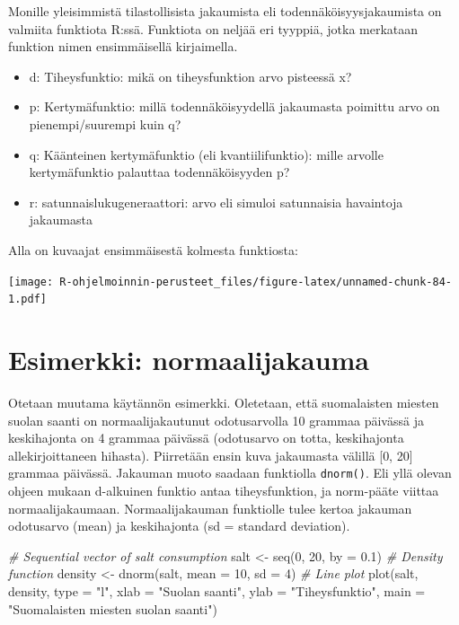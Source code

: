 \documentclass[
]{book}
\newenvironment{Shaded}{\begin{snugshade}}{\end{snugshade}}
\newcommand{\AttributeTok}[1]{\textcolor[rgb]{0.77,0.63,0.00}{#1}}
\newcommand{\CommentTok}[1]{\textcolor[rgb]{0.56,0.35,0.01}{\textit{#1}}}
\newcommand{\DecValTok}[1]{\textcolor[rgb]{0.00,0.00,0.81}{#1}}
\newcommand{\FloatTok}[1]{\textcolor[rgb]{0.00,0.00,0.81}{#1}}
\newcommand{\FunctionTok}[1]{\textcolor[rgb]{0.00,0.00,0.00}{#1}}
\newcommand{\NormalTok}[1]{#1}
\newcommand{\OtherTok}[1]{\textcolor[rgb]{0.56,0.35,0.01}{#1}}
\newcommand{\StringTok}[1]{\textcolor[rgb]{0.31,0.60,0.02}{#1}}
\providecommand{\tightlist}{%
  \setlength{\itemsep}{0pt}\setlength{\parskip}{0pt}}
\begin{document}
Monille yleisimmistä tilastollisista jakaumista eli todennäköisyysjakaumista on valmiita funktiota R:ssä. Funktiota on neljää eri tyyppiä, jotka merkataan funktion nimen ensimmäisellä kirjaimella.

\begin{itemize}
\tightlist
\item
  d: Tiheysfunktio: mikä on tiheysfunktion arvo pisteessä x?
\item
  p: Kertymäfunktio: millä todennäköisyydellä jakaumasta poimittu arvo on pienempi/suurempi kuin q?
\item
  q: Käänteinen kertymäfunktio (eli kvantiilifunktio): mille arvolle kertymäfunktio palauttaa todennäköisyyden p?
\item
  r: satunnaislukugeneraattori: arvo eli simuloi satunnaisia havaintoja jakaumasta
\end{itemize}

Alla on kuvaajat ensimmäisestä kolmesta funktiosta:

\texttt{[image: R-ohjelmoinnin-perusteet\_files/figure-latex/unnamed-chunk-84-1.pdf]}

\hypertarget{esimerkki-normaalijakauma}{%
\section{Esimerkki: normaalijakauma}\label{esimerkki-normaalijakauma}}

Otetaan muutama käytännön esimerkki. Oletetaan, että suomalaisten miesten suolan saanti on normaalijakautunut odotusarvolla 10 grammaa päivässä ja keskihajonta on 4 grammaa päivässä (odotusarvo on totta, keskihajonta allekirjoittaneen hihasta). Piirretään ensin kuva jakaumasta välillä {[}0, 20{]} grammaa päivässä. Jakauman muoto saadaan funktiolla \texttt{dnorm()}. Eli yllä olevan ohjeen mukaan d-alkuinen funktio antaa tiheysfunktion, ja norm-pääte viittaa normaalijakaumaan. Normaalijakauman funktiolle tulee kertoa jakauman odotusarvo (mean) ja keskihajonta (sd = standard deviation).

\begin{Shaded}
\begin{Highlighting}[]
\CommentTok{\# Sequential vector  of salt consumption}
\NormalTok{salt }\OtherTok{\textless{}{-}} \FunctionTok{seq}\NormalTok{(}\DecValTok{0}\NormalTok{, }\DecValTok{20}\NormalTok{, }\AttributeTok{by =} \FloatTok{0.1}\NormalTok{)}
\CommentTok{\# Density function}
\NormalTok{density }\OtherTok{\textless{}{-}} \FunctionTok{dnorm}\NormalTok{(salt, }\AttributeTok{mean =} \DecValTok{10}\NormalTok{, }\AttributeTok{sd =} \DecValTok{4}\NormalTok{)}
\CommentTok{\# Line plot}
\FunctionTok{plot}\NormalTok{(salt, density, }\AttributeTok{type =} \StringTok{"l"}\NormalTok{,}
     \AttributeTok{xlab =} \StringTok{"Suolan saanti"}\NormalTok{, }\AttributeTok{ylab =} \StringTok{"Tiheysfunktio"}\NormalTok{,}
     \AttributeTok{main =} \StringTok{"Suomalaisten miesten suolan saanti"}\NormalTok{)}
\end{Highlighting}
\end{Shaded}
\end{document}
